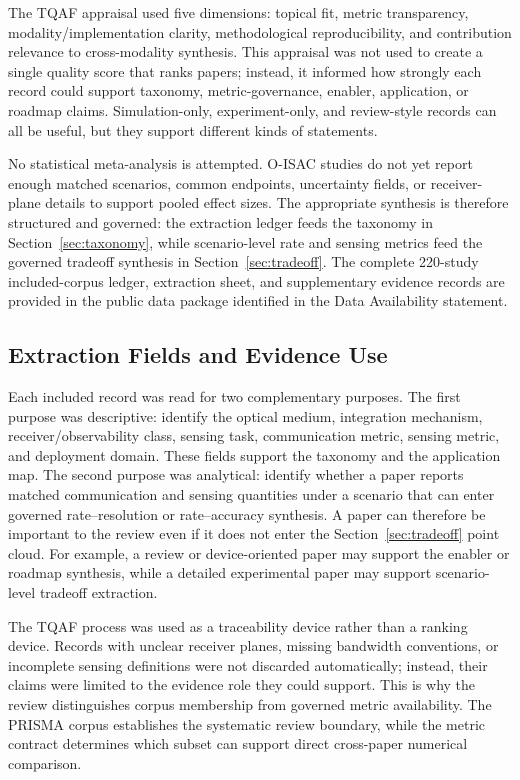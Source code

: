 \documentclass[letterpaper,journal]{IEEEtran}
\begin{document}
The TQAF appraisal used five dimensions: topical fit, metric transparency, modality/implementation clarity, methodological reproducibility, and contribution relevance to cross-modality synthesis. This appraisal was not used to create a single quality score that ranks papers; instead, it informed how strongly each record could support taxonomy, metric-governance, enabler, application, or roadmap claims. Simulation-only, experiment-only, and review-style records can all be useful, but they support different kinds of statements.

No statistical meta-analysis is attempted. O-ISAC studies do not yet report enough matched scenarios, common endpoints, uncertainty fields, or receiver-plane details to support pooled effect sizes. The appropriate synthesis is therefore structured and governed: the extraction ledger feeds the taxonomy in Section~\ref{sec:taxonomy}, while scenario-level rate and sensing metrics feed the governed tradeoff synthesis in Section~\ref{sec:tradeoff}. The complete 220-study included-corpus ledger, extraction sheet, and supplementary evidence records are provided in the public data package identified in the Data Availability statement.

\subsection{Extraction Fields and Evidence Use}

Each included record was read for two complementary purposes. The first purpose was descriptive: identify the optical medium, integration mechanism, receiver/observability class, sensing task, communication metric, sensing metric, and deployment domain. These fields support the taxonomy and the application map. The second purpose was analytical: identify whether a paper reports matched communication and sensing quantities under a scenario that can enter governed rate--resolution or rate--accuracy synthesis. A paper can therefore be important to the review even if it does not enter the Section~\ref{sec:tradeoff} point cloud. For example, a review or device-oriented paper may support the enabler or roadmap synthesis, while a detailed experimental paper may support scenario-level tradeoff extraction.

The TQAF process was used as a traceability device rather than a ranking device. Records with unclear receiver planes, missing bandwidth conventions, or incomplete sensing definitions were not discarded automatically; instead, their claims were limited to the evidence role they could support. This is why the review distinguishes corpus membership from governed metric availability. The PRISMA corpus establishes the systematic review boundary, while the metric contract determines which subset can support direct cross-paper numerical comparison.
\end{document}
